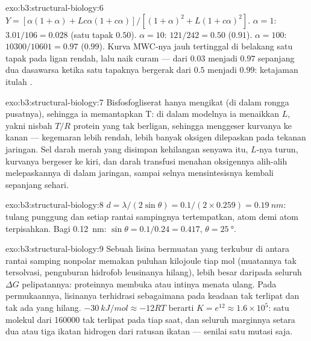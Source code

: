 \begin{solution}{exo:b3:structural-biology:6}
$Y = [\alpha(1+\alpha) + Lc\alpha(1+c\alpha)]/[(1+\alpha)^{2} +
L(1+c\alpha)^{2}]$. $\alpha = 1$: $3.01/106 = 0.028$ (satu tapak
$0.50$). $\alpha = 10$: $121/242 = 0.50$ ($0.91$). $\alpha = 100$:
$\num{10300}/\num{10601} = 0.97$ ($0.99$). Kurva MWC-nya jauh tertinggal
di belakang satu tapak pada ligan rendah, lalu naik curam --- dari $0.03$
menjadi $0.97$ sepanjang dua dasawarsa ketika satu tapaknya bergerak dari
$0.5$ menjadi $0.99$: ketajaman itulah .
\end{solution}

\begin{solution}{exo:b3:structural-biology:7}
Bisfosfogliserat hanya mengikat  (di dalam rongga pusatnya), sehingga
ia memantapkan T: di dalam modelnya ia menaikkan $L$, yakni nisbah $T/R$
protein yang tak berligan, sehingga menggeser kurvanya ke kanan --- kegemaran
lebih rendah, lebih banyak oksigen dilepaskan pada tekanan jaringan. Sel darah
merah yang disimpan kehilangan senyawa itu, $L$-nya turun, kurvanya bergeser
ke kiri, dan darah transfusi menahan oksigennya alih-alih melepaskannya di
dalam jaringan, sampai selnya mensintesisnya kembali sepanjang sehari.
\end{solution}

\begin{solution}{exo:b3:structural-biology:8}
$d = \lambda/(2\sin\theta) = 0.1/(2\times 0.259) = \qty{0.19}{nm}$: tulang
punggung dan setiap rantai sampingnya tertempatkan, atom demi atom terpisahkan.
Bagi \qty{0.12}{nm}: $\sin\theta = 0.1/0.24 = 0.417$, $\theta =
\qty{25}{\degree}$.
\end{solution}

\begin{solution}{exo:b3:structural-biology:9}
Sebuah lisina bermuatan yang terkubur di antara rantai samping nonpolar
memakan puluhan kilojoule tiap mol (muatannya tak tersolvasi, penguburan
hidrofob leusinanya hilang), lebih besar daripada seluruh $\Delta G$
pelipatannya: proteinnya membuka  atau intinya menata ulang. Pada
permukaannya, lisinanya terhidrasi sebagaimana pada keadaan tak terlipat dan
tak ada yang hilang. $\qty{-30}{kJ/mol} \approx -12RT$ berarti $K = e^{12} \approx 1.6\times
10^{5}$: satu molekul dari \num{160000} tak terlipat pada tiap saat, dan
seluruh marginnya setara dua atau tiga ikatan hidrogen dari ratusan ikatan
--- senilai satu mutasi saja.
\end{solution}

